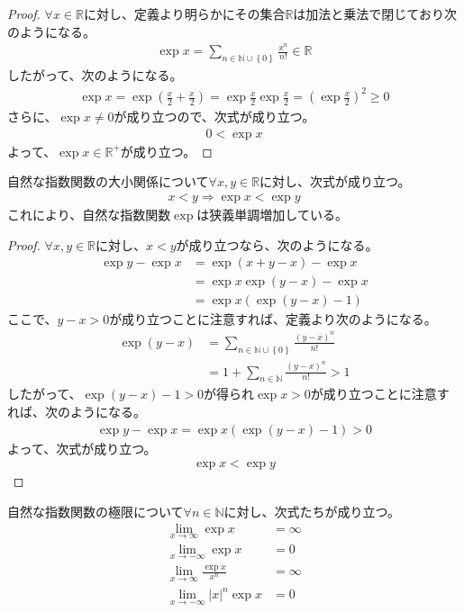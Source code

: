 \documentclass[dvipdfmx]{jsarticle}
\begin{document}
\begin{proof}
$\forall x \in \mathbb{R}$に対し、定義より明らかにその集合$\mathbb{R}$は加法と乗法で閉じており次のようになる。
\begin{align*}
\exp x = \sum_{n \in \mathbb{N} \cup \left\{ 0 \right\}} \frac{x^{n}}{n!} \in \mathbb{R}
\end{align*}
したがって、次のようになる。
\begin{align*}
\exp x = \exp\left( \frac{x}{2} + \frac{x}{2} \right) = \exp\frac{x}{2}\exp\frac{x}{2} = \left( \exp\frac{x}{2} \right)^{2} \geq 0
\end{align*}
さらに、$\exp x \neq 0$が成り立つので、次式が成り立つ。
\begin{align*}
0 < \exp x
\end{align*}
よって、$\exp x \in \mathbb{R}^{+}$が成り立つ。
\end{proof}
\begin{thm}\label{4.3.1.8}
自然な指数関数の大小関係について$\forall x,y \in \mathbb{R}$に対し、次式が成り立つ。
\begin{align*}
x < y \Rightarrow \exp x < \exp y
\end{align*}
これにより、自然な指数関数$\exp$は狭義単調増加している。
\end{thm}
\begin{proof}
$\forall x,y \in \mathbb{R}$に対し、$x < y$が成り立つなら、次のようになる。
\begin{align*}
\exp y - \exp x &= \exp(x + y - x) - \exp x\\
&= \exp x\exp(y - x) - \exp x\\
&= \exp x\left( \exp(y - x) - 1 \right)
\end{align*}
ここで、$y - x > 0$が成り立つことに注意すれば、定義より次のようになる。
\begin{align*}
\exp(y - x) &= \sum_{n \in \mathbb{N} \cup \left\{ 0 \right\}} \frac{(y - x)^{n}}{n!}\\
&= 1 + \sum_{n \in \mathbb{N}} \frac{(y - x)^{n}}{n!} > 1
\end{align*}
したがって、$\exp(y - x) - 1 > 0$が得られ$\exp x > 0$が成り立つことに注意すれば、次のようになる。
\begin{align*}
\exp y - \exp x = \exp x\left( \exp(y - x) - 1 \right) > 0
\end{align*}
よって、次式が成り立つ。
\begin{align*}
\exp x < \exp y
\end{align*}
\end{proof}
\begin{thm}\label{4.3.1.9}
自然な指数関数の極限について$\forall n \in \mathbb{N}$に対し、次式たちが成り立つ。
\begin{align*}
\lim_{x \rightarrow \infty}{\exp x} &= \infty\\
\lim_{x \rightarrow - \infty}{\exp x} &= 0\\
\lim_{x \rightarrow \infty}\frac{\exp x}{x^{n}} &= \infty\\
\lim_{x \rightarrow - \infty}{|x|^{n}\exp x} &= 0
\end{align*}
\end{thm}
\end{document}
